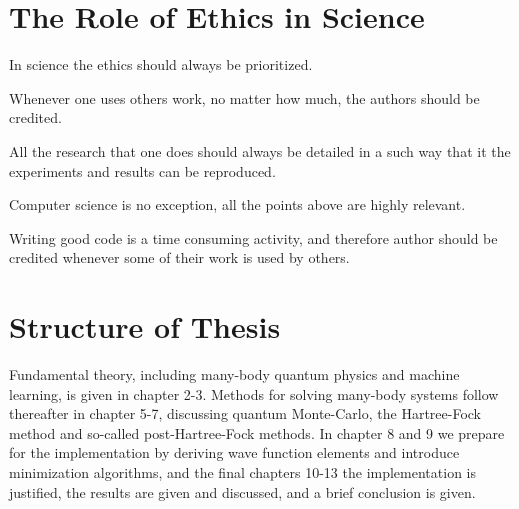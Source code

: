 \section{The Role of Ethics in Science}
In science the ethics should always be prioritized. 

Whenever one uses others work, no matter how much, the authors should be credited. 

All the research that one does should always be detailed in a such way that it the experiments and results can be reproduced. 

Computer science is no exception, all the points above are highly relevant.  

Writing good code is a time consuming activity, and therefore author should be credited whenever some of their work is used by others. 

\section{Structure of Thesis}
Fundamental theory, including many-body quantum physics and machine learning, is given in chapter 2-3. Methods for solving many-body systems follow thereafter in chapter 5-7, discussing quantum Monte-Carlo, the Hartree-Fock method and so-called post-Hartree-Fock methods. In chapter 8 and 9 we prepare for the implementation by deriving wave function elements and introduce minimization algorithms, and the final chapters 10-13 the implementation is justified, the results are given and discussed, and a brief conclusion is given.
